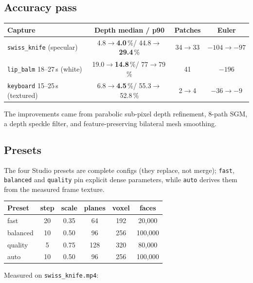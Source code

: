 \documentclass[11pt,a4paper]{article}
\newcommand{\pct}{\,\%}
\newcommand{\code}[1]{\texttt{#1}}
\begin{document}
\subsection{Accuracy pass}
\label{sec:accuracy}

\begin{center}
\begin{tabular}{lccc}
\toprule
\textbf{Capture} & \textbf{Depth median / p90} & \textbf{Patches} & \textbf{Euler}\\
\midrule
\code{swiss\_knife} (specular) & 4.8$\to$\textbf{4.0}\pct / 44.8$\to$\textbf{29.4}\pct & 34$\to$33 & $-104\to-97$\\
\code{lip\_balm} 18--27\,s (white) & 19.0$\to$\textbf{14.8}\pct / 77$\to$79\pct & 41 & $-196$\\
\code{keyboard} 15--25\,s (textured) & 6.8$\to$\textbf{4.5}\pct / 55.3$\to$52.8\pct & 2$\to$4 & $-36\to-9$\\
\bottomrule
\end{tabular}
\end{center}

The improvements came from parabolic sub-pixel depth refinement, 8-path SGM, a depth speckle
filter, and feature-preserving bilateral mesh smoothing.

\subsection{Presets}
\label{sec:presets}

The four Studio presets are complete configs (they replace, not merge); \code{fast},
\code{balanced} and \code{quality} pin explicit dense parameters, while \code{auto} derives them
from the measured frame texture.

\begin{center}
\begin{tabular}{lccccc}
\toprule
\textbf{Preset} & \textbf{step} & \textbf{scale} & \textbf{planes} & \textbf{voxel} & \textbf{faces}\\
\midrule
fast & 20 & 0.35 & 64 & 192 & 20{,}000\\
balanced & 10 & 0.50 & 96 & 256 & 100{,}000\\
quality & 5 & 0.75 & 128 & 320 & 80{,}000\\
auto & 10 & 0.50 & 96 & 256 & 100{,}000\\
\bottomrule
\end{tabular}
\end{center}

Measured on \code{swiss\_knife.mp4}:
\end{document}
